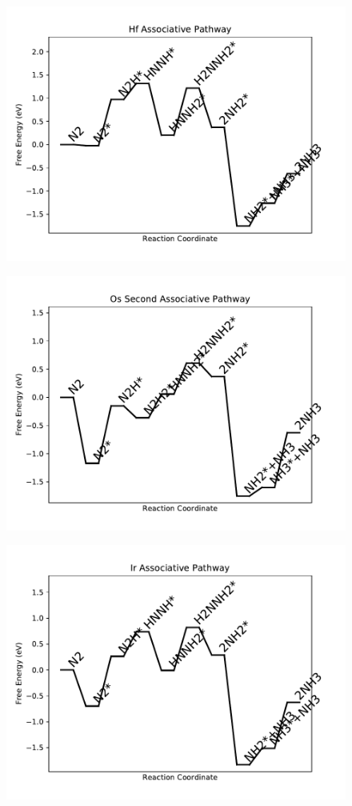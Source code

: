 \begin{figure}
\includegraphics[width=0.8\linewidth]{data/plots/Hf_associative.pdf}
\end{figure}

\begin{figure}
\includegraphics[width=0.8\linewidth]{data/plots/Os_associative_2.pdf}
\end{figure}

\begin{figure}
\includegraphics[width=0.8\linewidth]{data/plots/Ir_associative.pdf}
\end{figure}

